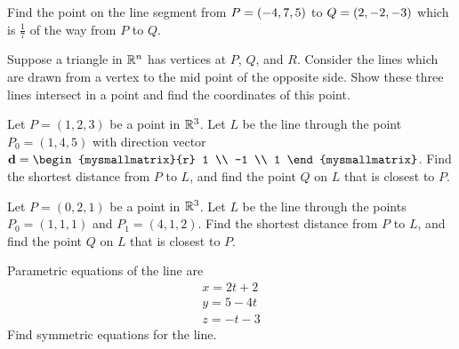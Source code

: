 \begin{enumialphparenastyle}
\begin{ex}
  Find the point on the line segment from $P = \left(-4, 7, 5 \right) $ to
  $Q = \left(2 , -2 , -3 \right) $ which is $\frac{1}{7}$ of the way from $P$
  to $Q$.
\end{ex} 

\begin{ex} Suppose a triangle in $\mathbb{R}^{n}$ has vertices at $P$, $Q$,
  and $R$.  Consider the lines which are drawn from a vertex to the
  mid point of the opposite side. Show these three lines intersect in
  a point and find the coordinates of this point.
\end{ex} 

\begin{ex} Let $P = (1,2,3)$ be a point in $\mathbb{R}^3$. Let $L$ be the line
  through the point $P_0 = (1, 4, 5)$ with direction vector
  $\vect{d} = \begin{mysmallmatrix}{r} 1 \\ -1 \\
    1 \end{mysmallmatrix}$. Find the shortest distance from $P$ to
  $L$, and find the point $Q$ on $L$ that is closest to $P$.
\end{ex}

\begin{ex} Let $P = (0,2,1)$ be a point in $\mathbb{R}^3$. Let $L$ be the line through the points $P_0 = (1, 1, 1)$ and $P_1 = (4, 1, 2)$. Find the shortest distance from $P$ to $L$, and find the point $Q$ on $L$ that is closest to $P$. 
\end{ex}


\begin{ex}
  Parametric equations of the line are
  \begin{equation*}
    \begin{array}{c}
      x = 2t+2\\
      y = 5-4t\\
      z= -t-3
    \end{array}
  \end{equation*}
  Find symmetric equations for the line.
\end{ex} 


\end{enumialphparenastyle}
